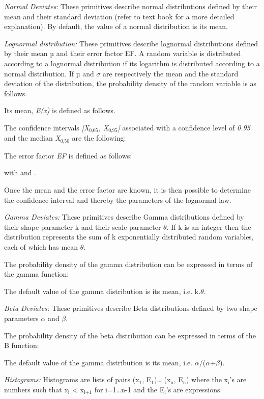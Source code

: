 \documentclass[11pt]{article}
\begin{document}
\emph{Normal Deviates}: These primitives describe normal distributions
defined by their mean and their standard deviation (refer to text book
for a more detailed explanation). By default, the value of a normal
distribution is its mean.

\emph{Lognormal distribution:} These primitives describe lognormal
distributions defined by their mean µ and their error factor EF. A
random variable is distributed according to a lognormal distribution if
its logarithm is distributed according to a normal distribution. If µ
and \(\sigma\) are respectively the mean and the standard deviation of the
distribution, the probability density of the random variable is as
follows.

Its mean, \emph{E(x)} is defined as follows.

The confidence intervals \emph{[X\(_{\text{0,05}}\), X\(_{\text{0,95}}\)]} associated with a
confidence level of \emph{0.95} and the median \emph{X\(_{\text{0,50}}\)} are the following:

The error factor \emph{EF} is defined as follows:

with and .

Once the mean and the error factor are known, it is then possible to
determine the confidence interval and thereby the parameters of the
lognormal law.

\emph{Gamma Deviates:} These primitives describe Gamma distributions defined
by their shape parameter k and their scale parameter \(\theta\). If k is an
integer then the distribution represents the sum of k exponentially
distributed random variables, each of which has mean \(\theta\).

The probability density of the gamma distribution can be expressed in
terms of the gamma function:

The default value of the gamma distribution is its mean, i.e. k.\(\theta\).

\emph{Beta Deviates:} These primitives describe Beta distributions defined by
two shape parameters \(\alpha\) and \(\beta\).

The probability density of the beta distribution can be expressed in
terms of the B function:

The default value of the gamma distribution is its mean, i.e. \(\alpha\)/(\(\alpha\)+\(\beta\)).

\emph{Histograms:} Histograms are lists of pairs (x\(_{\text{1}}\), E\(_{\text{1}}\))\ldots{} (x\(_{\text{n}}\),
E\(_{\text{n}}\)) where the x\(_{\text{i}}\)'s are numbers such that x\(_{\text{i}}\) < x\(_{\text{i+1}}\) for
i=1\ldots{}n-1 and the E\(_{\text{i}}\)'s are expressions.
\end{document}
